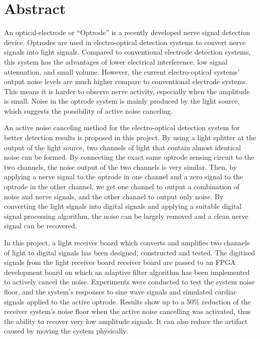 \chapter{Abstract}



An optical-electrode or ``Optrode'' is a recently developed nerve signal detection device. Optrodes are used in electro-optical detection systems to convert nerve signals into light signals. Compared to conventional electrode detection systems, this system has the advantages of lower electrical interference, low signal attenuation, and small volume. However, the current electro-optical systems' output noise levels are much higher compare to conventional electrode systems. This means it is harder to observe nerve activity, especially when the amplitude is small. Noise in the optrode system is mainly produced by the light source, which suggests the possibility of active noise canceling.

An active noise canceling method for the electro-optical detection system for better detection results is proposed in this project. By using a light splitter at the output of the light source, two channels of light that contain almost identical noise can be formed. By connecting the exact same optrode sensing circuit to the two channels, the noise output of the two channels is very similar. Then, by applying a nerve signal to the optrode in one channel and a zero signal to the optrode in the other channel, we get one channel to output a combination of noise and nerve signals, and the other channel to output only noise. By converting the light signals into digital signals and applying a suitable digital signal processing algorithm, the noise can be largely removed and a clean nerve signal can be recovered.

In this project, a light receiver board which converts and amplifies two channels of light to digital signals has been designed, constructed and tested.  The digitised signals from the light receiver board receiver board are passed to an FPGA development board on which an adaptive filter algorithm has been implemented to actively cancel the noise. Experiments were conducted to test the system noise floor, and the system's responses to sine wave signals and simulated cardiac signals applied to the active optrode. Results show up to a 50\% reduction of the receiver system's noise floor when the active noise cancelling was activated, thus the ability to recover very low amplitude signals.  It can also reduce the artifact caused by moving the system physically.


